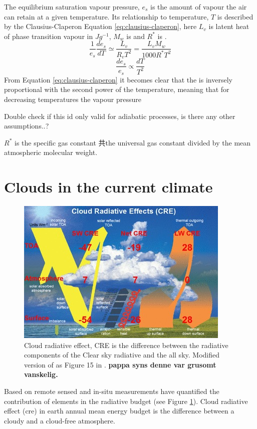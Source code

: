 The equilibrium saturation vapour pressure, $e_s$ is the amount of vapour the air can retain at a given temperature. Its relationship to temperature, $T$ is described by the Clausius-Claperon Equation \eqref{eq:clausius-claperon}, here $L_v$ is latent heat of phase transition vapour in $J g^{-1}$, $M_w$ is and $R^*$ is .
\begin{equation} \label{eq:clasius_claperon}
    \frac{1}{e_s} \frac{de_s}{dT} \simeq \frac{L_v}{R_v T^2} = \frac{L_v M_w}{1000R^*T^2}
\end{equation}
\begin{equation} \label{eq:clasius_claperon_prop}
     \frac{de_s}{e_s} \propto \frac{dT}{T^2} 
\end{equation}
From Equation \eqref{eq:clausius-claperon} it becomes clear that the  is inversely proportional with the second power of the temperature, meaning that for decreasing temperatures the vapour pressure 

Double check if this id only valid for adiabatic processes, is there any other assumptions..?

$R^*$ is the specific gas constant 共the universal
gas constant divided by the mean atmospheric molecular
weight. 
\section{Clouds in the current climate} \label{sec:intro_cloud_current_climate}
\begin{figure}[h]
    \centering
    \includegraphics[scale = 7]{Chapter1_Intro/images/CRE_wild2019.jpg}
    \caption{Cloud radiative effect, CRE is the difference between the radiative components of the Clear sky radiative and the all sky. Modified version of as Figure 15 in \cite{Wild2019TheModels}. \textbf{pappa syns denne var grusomt vanskelig.}}
    \label{fig:cre}
\end{figure}
Based on remote sensed and in-situ measurements \citeauthor{Wild2019TheModels} have quantified the contribution of elements in the radiative budget (see Figure \ref{fig:cre}). Cloud radiative effect (\acrshort{cre}) in earth annual mean energy budget is the difference between a cloudy and a cloud-free atmosphere. 

